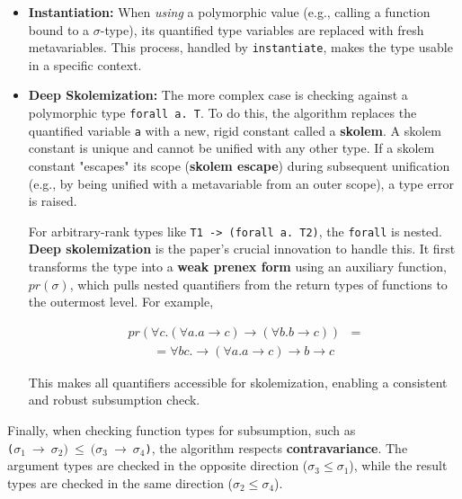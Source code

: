 \begin{itemize}
    \item \textbf{Instantiation:} When \textit{using} a polymorphic value (e.g., calling a function bound to a $\sigma$-type), its quantified type variables are replaced with fresh metavariables. This process, handled by \texttt{instantiate}, makes the type usable in a specific context.

    \item \textbf{Deep Skolemization:} The more complex case is checking against a polymorphic type \texttt{forall a. T}. To do this, the algorithm replaces the quantified variable \texttt{a} with a new, rigid constant called a \textbf{skolem}. A skolem constant is unique and cannot be unified with any other type. If a skolem constant "escapes" its scope (\textbf{skolem escape}) during subsequent unification (e.g., by being unified with a metavariable from an outer scope), a type error is raised.

          For arbitrary-rank types like \texttt{T1 -> (forall a. T2)}, the \texttt{forall} is nested. \textbf{Deep skolemization} is the paper's crucial innovation to handle this. It first transforms the type into a \textbf{weak prenex form} using an auxiliary function, $pr(\sigma)$, which pulls nested quantifiers from the return types of functions to the outermost level. For example,

          \begin{equation}
              \begin{split}
                  pr(\forall c. (\forall a. a \rightarrow c) \rightarrow (\forall b. b \rightarrow c)) & = \\
                  \quad \quad =\forall b c. \rightarrow (\forall a. a \rightarrow c) \rightarrow b \rightarrow c
              \end{split}
          \end{equation}

          This makes all quantifiers accessible for skolemization, enabling a consistent and robust subsumption check.
\end{itemize}

Finally, when checking function types for subsumption, such as \\ \texttt{($\sigma_1~\rightarrow~\sigma_2)~\leq~(\sigma_3~\rightarrow~\sigma_4$)}, the algorithm respects \textbf{contravariance}. The argument types are checked in the opposite direction ($\sigma_3 \leq \sigma_1$), while the result types are checked in the same direction ($\sigma_2 \leq \sigma_4$).

